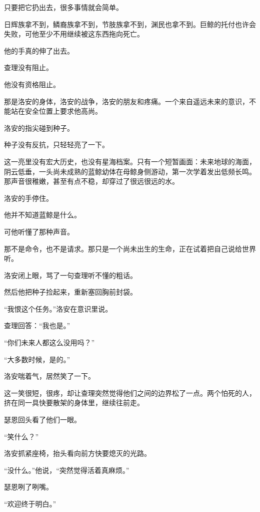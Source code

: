 只要把它扔出去，很多事情就会简单。

日辉族拿不到，鳞裔族拿不到，节肢族拿不到，渊民也拿不到。巨鲸的托付也许会失败，可他至少不用继续被这东西拖向死亡。

他的手真的伸了出去。

查理没有阻止。

他没有资格阻止。

那是洛安的身体，洛安的战争，洛安的朋友和疼痛。一个来自遥远未来的意识，不能站在安全位置上要求他高尚。

洛安的指尖碰到种子。

种子没有反抗，只轻轻亮了一下。

这一亮里没有宏大历史，也没有星海档案。只有一个短暂画面：未来地球的海面，阴云低垂，一头尚未成熟的蓝鲸幼体在母鲸身侧游动，第一次学着发出低频长鸣。那声音很稚嫩，甚至有点不稳，却穿过了很远很远的水。

洛安的手停住。

他并不知道蓝鲸是什么。

可他听懂了那种声音。

那不是命令，也不是请求。那只是一个尚未出生的生命，正在试着把自己说给世界听。

洛安闭上眼，骂了一句查理听不懂的粗话。

然后他把种子捡起来，重新塞回胸前封袋。

“我恨这个任务。”洛安在意识里说。

查理回答：“我也是。”

“你们未来人都这么没用吗？”

“大多数时候，是的。”

洛安喘着气，居然笑了一下。

这一笑很短，很疼，却让查理突然觉得他们之间的边界松了一点。两个怕死的人，挤在同一具快要散架的身体里，继续往前走。

瑟恩回头看了他们一眼。

“笑什么？”

洛安抓紧座椅，抬头看向前方快要熄灭的光路。

“没什么。”他说，“突然觉得活着真麻烦。”

瑟恩咧了咧嘴。

“欢迎终于明白。”
